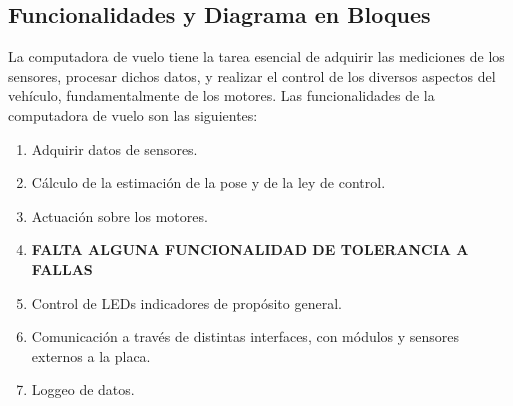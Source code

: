 

\subsection{Funcionalidades y Diagrama en Bloques}



La computadora de vuelo tiene la tarea esencial de adquirir las mediciones de los sensores, procesar dichos datos, y realizar el control de los diversos aspectos del vehículo, fundamentalmente de los motores. Las funcionalidades de la computadora de vuelo son las siguientes:

\begin{enumerate}
    \item Adquirir datos de sensores.
    \item Cálculo de la estimación de la pose y de la ley de control.
    \item Actuación sobre los motores.
    \item \textbf{{\color{red} FALTA ALGUNA FUNCIONALIDAD DE TOLERANCIA A FALLAS}}
    \item Control de LEDs indicadores de propósito general.
    \item Comunicación a través de distintas interfaces, con módulos y sensores externos a la placa.
    \item Loggeo de datos.
\end{enumerate}

